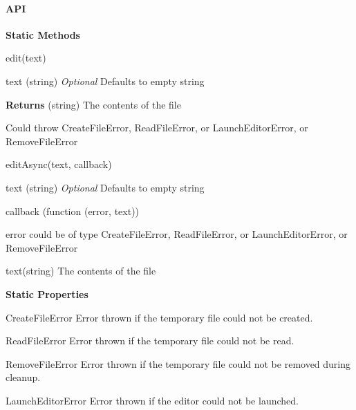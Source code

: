 \paragraph*{A\+PI}

{\bfseries Static Methods}
\begin{DoxyItemize}
\item {\ttfamily edit(text)}
\begin{DoxyItemize}
\item {\ttfamily text} (string) {\itshape Optional} Defaults to empty string
\item {\bfseries Returns} (string) The contents of the file
\item Could throw {\ttfamily Create\+File\+Error}, {\ttfamily Read\+File\+Error}, or {\ttfamily Launch\+Editor\+Error}, or {\ttfamily Remove\+File\+Error}
\end{DoxyItemize}
\item {\ttfamily edit\+Async(text, callback)}
\begin{DoxyItemize}
\item {\ttfamily text} (string) {\itshape Optional} Defaults to empty string
\item {\ttfamily callback} (function (error, text))
\begin{DoxyItemize}
\item {\ttfamily error} could be of type {\ttfamily Create\+File\+Error}, {\ttfamily Read\+File\+Error}, or {\ttfamily Launch\+Editor\+Error}, or {\ttfamily Remove\+File\+Error}
\item {\ttfamily text}(string) The contents of the file ~\newline

\end{DoxyItemize}
\end{DoxyItemize}
\end{DoxyItemize}

{\bfseries Static Properties}
\begin{DoxyItemize}
\item {\ttfamily Create\+File\+Error} Error thrown if the temporary file could not be created.
\item {\ttfamily Read\+File\+Error} Error thrown if the temporary file could not be read.
\item {\ttfamily Remove\+File\+Error} Error thrown if the temporary file could not be removed during cleanup.
\item {\ttfamily Launch\+Editor\+Error} Error thrown if the editor could not be launched.
\end{DoxyItemize}

